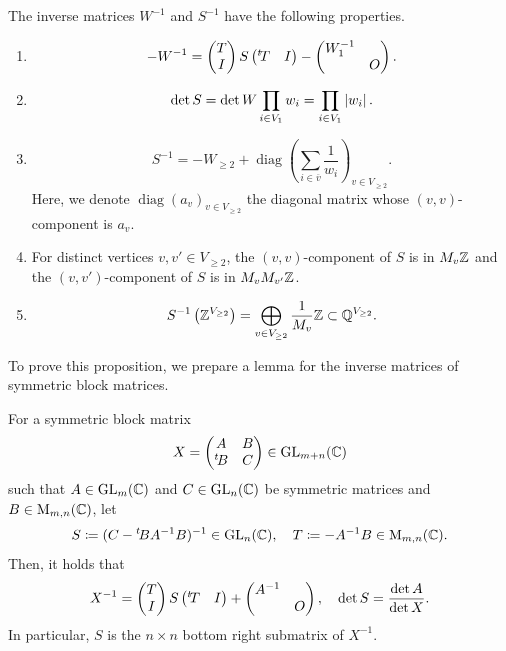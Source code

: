 \documentclass[11pt,a4paper,lualatex]{amsart}
\DeclareMathOperator{\diag}{diag}
\numberwithin{equation}{section} %
\begin{document}
The inverse matrices $ W^{-1} $ and $ S^{-1} $ have the following properties.

\begin{prop} \label{prop:S}
	\begin{enumerate}
		\item \label{item:prop:S1}		
		\[
		-W^{-1} = \begin{pmatrix}T \\ I\end{pmatrix} S \begin{pmatrix}{}^t\!T & I\end{pmatrix} - \begin{pmatrix}W_1^{-1} & \\ & O\end{pmatrix}.
		\]	
		\item \label{item:prop:S2}
		\[
		\det S =  \det W \prod_{i \in V_1} w_i
		= \prod_{i \in V_1} \left\lvert w_i\right\rvert.
		\]
		\item \label{item:prop:S3}
		\[
		S^{-1} = -W_{\ge 2} + \diag \left( \sum_{i \in \overline{v}} \frac{1}{w_i} \right)_{v \in V_{\ge 2}}.
		\]
		Here, we denote $ \diag(a_v)_{v \in V_{\ge 2}} $ the diagonal matrix whose $ (v, v) $-component is $ a_v $. 
		\item \label{item:prop:S4}
		For distinct vertices $ v, v' \in V_{\ge 2} $, the $ (v, v) $-component of $ S $ is in $ M_v \mathbb{Z} $ and the $ (v, v') $-component of $ S $ is in $ M_v M_{v'} \mathbb{Z} $. 
		\item \label{item:prop:S5}
		\[	
		S^{-1} \left(\mathbb{Z}^{V_{\ge 2}} \right) = \bigoplus_{v \in V_{\ge 2}} \frac{1}{M_v} \mathbb{Z} \subset \mathbb{Q}^{V_{\ge 2}}.
		\]		
	\end{enumerate}
\end{prop}

To prove this proposition, we prepare a lemma for the inverse matrices of symmetric block matrices.

\begin{lem} \label{lem:block_matrix}
	For a symmetric block matrix
	\[
	X = \begin{pmatrix}A & B \\ {}^t\!B & C\end{pmatrix} \in \operatorname{GL}_{m+n} (\mathbb{C})
	\]
	such that $ A \in \operatorname{GL}_m(\mathbb{C}) $ and $ C \in \operatorname{GL}_n(\mathbb{C}) $ be symmetric matrices and $ B \in \operatorname{M}_{m, n}(\mathbb{C}) $, let
	\[
	S \coloneqq (C - {}^t\!B A^{-1} B)^{-1} \in \GL_n(\bbC), \quad
	T \coloneqq -A^{-1} B \in \Mat_{m, n}(\bbC).
	\]
	Then, it holds that
	\[
	X^{-1} = \begin{pmatrix}T \\ I\end{pmatrix} S \begin{pmatrix}{}^t\!T & I\end{pmatrix} + \begin{pmatrix}A^{-1} & \\ & O\end{pmatrix}, \quad
	\det S = \frac{\det A}{\det X}.
	\]	
	In particular, $ S $ is the $ n \times n $ bottom right submatrix of $ X^{-1} $. 
\end{lem}
\end{document}
